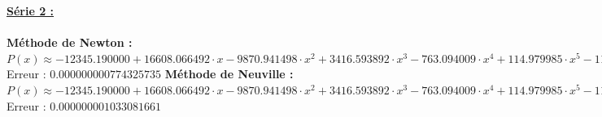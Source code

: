 \documentclass{report}
\begin{document}
	\noindent\underline{\textbf{Série 2 :}} \\ \\
	\textbf{Méthode de Newton :}\\
	$P(x) \approx -12345.190000 + 16608.066492 \cdot x- 9870.941498 \cdot x^{2}  + 3416.593892 \cdot x^{3} - 763.094009 \cdot x^{4}  + 114.979985 \cdot x^{5} - 11.842442 \cdot x^{6}  + 0.823658 \cdot x^{7} - 0.037039 \cdot x^{8}  + 0.000973 \cdot x^{9} - 0.000011 \cdot x^{10} $\\
	Erreur : $0.000000000774325735$
	\newline
	\newline
	\textbf{Méthode de Neuville :}\\
	$P(x) \approx -12345.190000 + 16608.066492 \cdot x- 9870.941498 \cdot x^{2}  + 3416.593892 \cdot x^{3} - 763.094009 \cdot x^{4}  + 114.979985 \cdot x^{5} - 11.842442 \cdot x^{6}  + 0.823658 \cdot x^{7} - 0.037039 \cdot x^{8}  + 0.000973 \cdot x^{9} - 0.000011 \cdot x^{10} $\\
	Erreur : $0.000000001033081661$
	\newline
	\newline
	
\end{document}
